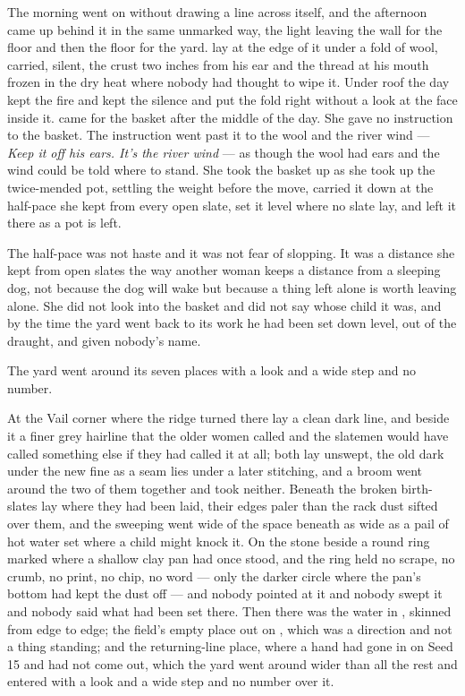The morning went on without drawing a line across itself, and the afternoon came up behind it in the same unmarked way, the light leaving the wall for the floor and then the floor for the yard.  lay at the edge of it under a fold of wool, carried, silent, the crust two inches from his ear and the thread at his mouth frozen in the dry heat where nobody had thought to wipe it. Under  roof the day kept the fire and kept the silence and put the fold right without a look at the face inside it.  came for the basket after the middle of the day. She gave no instruction to the basket. The instruction went past it to the wool and the river wind --- \emph{Keep it off his ears. It's the river wind} --- as though the wool had ears and the wind could be told where to stand. She took the basket up as she took up the twice-mended pot, settling the weight before the move, carried it down at the half-pace she kept from every open slate, set it level where no slate lay, and left it there as a pot is left.

The half-pace was not haste and it was not fear of slopping. It was a distance she kept from open slates the way another woman keeps a distance from a sleeping dog, not because the dog will wake but because a thing left alone is worth leaving alone. She did not look into the basket and did not say whose child it was, and by the time the yard went back to its work he had been set down level, out of the draught, and given nobody's name.

The yard went around its seven places with a look and a wide step and no number.

At the Vail corner where the  ridge turned there lay a clean dark line, and beside it a finer grey hairline that the older women called  and the slatemen would have called something else if they had called it at all; both lay unswept, the old dark under the new fine as a seam lies under a later stitching, and a broom went around the two of them together and took neither. Beneath  the broken birth-slates lay where they had been laid, their edges paler than the rack dust sifted over them, and the sweeping went wide of the space beneath as wide as a pail of hot water set where a child might knock it. On the stone beside  a round ring marked where a shallow clay pan had once stood, and the ring held no scrape, no crumb, no print, no chip, no word --- only the darker circle where the pan's bottom had kept the dust off --- and nobody pointed at it and nobody swept it and nobody said what had been set there. Then there was the water in , skinned from edge to edge; the field's empty place out on , which was a direction and not a thing standing; and the returning-line place, where a hand had gone in on Seed 15 and had not come out, which the yard went around wider than all the rest and entered with a look and a wide step and no number over it.

